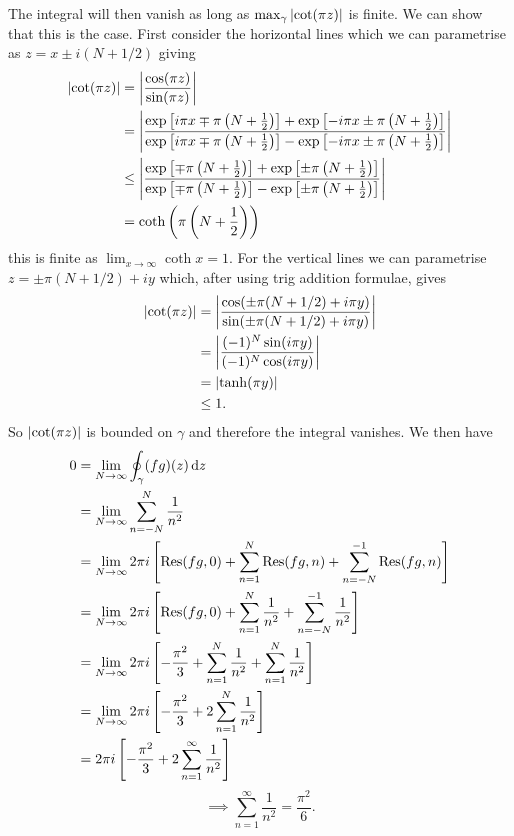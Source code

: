 \documentclass{article}
\begin{document}
    The integral will then vanish as long as \(\max_{\gamma}\abs{\cot(\pi z)}\) is finite.
    We can show that this is the case.
    First consider the horizontal lines which we can parametrise as \(z = x \pm i(N + 1/2)\) giving
    \begin{align*}
        \abs{\cot(\pi z)} &= \abs{\frac{\cos(\pi z)}{\sin(\pi z)}}\\
        &= \abs{\frac{\exp\left[ i\pi x \mp \pi\left( N + \frac{1}{2} \right) \right] + \exp\left[ -i\pi x\pm \pi\left( N + \frac{1}{2} \right) \right]}{\exp\left[ i\pi x \mp \pi\left( N + \frac{1}{2} \right) \right] - \exp\left[ -i\pi x\pm \pi\left( N + \frac{1}{2} \right) \right]}}\\
        &\le \abs{\frac{\exp\left[ \mp \pi\left( N + \frac{1}{2} \right) \right] + \exp\left[ \pm \pi\left( N + \frac{1}{2} \right) \right]}{\exp\left[ \mp \pi\left( N + \frac{1}{2} \right) \right] - \exp\left[ \pm \pi\left( N + \frac{1}{2} \right) \right]}}\\
        &= \coth\left( \pi\left( N + \frac{1}{2} \right) \right)
    \end{align*}
    this is finite as \(\lim_{x\to\infty} \coth x = 1\).
    For the vertical lines we can parametrise \(z = \pm \pi(N + 1/2) + iy\) which, after using trig addition formulae, gives
    \begin{align*}
        \abs{\cot(\pi z)} &= \abs{\frac{\cos(\pm \pi(N + 1/2) + i\pi y)}{\sin(\pm \pi(N + 1/2) + i\pi y)}}\\
        &= \abs{\frac{(-1)^N\sin(i\pi y)}{(-1)^N\cos(i\pi y)}}\\
        &= \abs{\tanh(\pi y)}\\
        &\le 1.
    \end{align*}
    So \(\abs{\cot(\pi z)}\) is bounded on \(\gamma\) and therefore the integral vanishes.
    We then have
    \begin{align*}
        0 &= \lim_{N\to\infty} \oint_{\gamma} (fg)(z) \dd{z}\\
        &= \lim_{N \to \infty} \sum_{n=-N}^{N} \frac{1}{n^2}\\
        &= \lim_{N\to\infty} 2\pi i\left[ \Res(fg, 0) + \sum_{n=1}^{N} \Res(fg, n) + \sum_{n=-N}^{-1} \Res(fg, n) \right]\\
        &= \lim_{N\to\infty} 2\pi i\left[ \Res(fg, 0) + \sum_{n=1}^{N} \frac{1}{n^2} + \sum_{n=-N}^{-1} \frac{1}{n^2} \right]\\
        &= \lim_{N\to\infty} 2\pi i\left[ -\frac{\pi^2}{3} + \sum_{n=1}^{N} \frac{1}{n^2} + \sum_{n=1}^{N} \frac{1}{n^2} \right]\\
        &= \lim_{N\to\infty} 2\pi i\left[ -\frac{\pi^2}{3} + 2\sum_{n=1}^{N} \frac{1}{n^2} \right]\\
        &= 2\pi i\left[ -\frac{\pi^2}{3} + 2\sum_{n=1}^{\infty} \frac{1}{n^2} \right]
    \end{align*}
    \[\implies \sum_{n=1}^{\infty} \frac{1}{n^2} = \frac{\pi^2}{6}.\]
    
\end{document}
